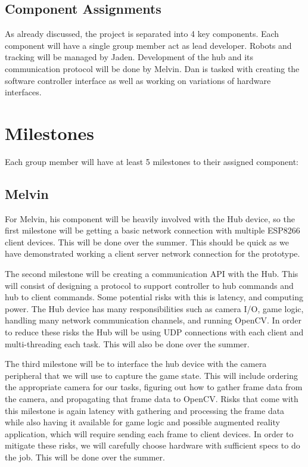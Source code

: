\documentclass[11pt]{ieeeconf}
\begin{document}
\subsection{Component Assignments}
As already discussed, the project is separated into 4 key components. Each component will have a single group member act as lead developer. Robots and tracking will be managed by Jaden. Development of the hub and its communication protocol will be done by Melvin. Dan is tasked with creating the software controller interface as well as working on variations of hardware interfaces. 


\section{Milestones}
Each group member will have at least 5 milestones to their assigned component: 

\subsection{Melvin}
For Melvin, his component will be heavily involved with the Hub device, so the first milestone will be getting a basic network connection with multiple ESP8266 client devices. This will be done over the summer. This should be quick as we have demonstrated working a client server network connection for the prototype. 

The second milestone will be creating a communication API with the Hub. This will consist of designing a protocol to support controller to hub commands and hub to client commands. Some potential risks with this is latency, and computing power. The Hub device has many responsibilities such as camera I/O, game logic, handling many network communication channels, and running OpenCV. In order to reduce these risks the Hub will be using UDP connections with each client and multi-threading each task. This will also be done over the summer.

The third milestone will be to interface the hub device with the camera peripheral that we will use to capture the game state. This will include ordering the appropriate camera for our tasks, figuring out how to gather frame data from the camera, and propagating that frame data to OpenCV. Risks that come with this milestone is again latency with gathering and processing the frame data while also having it available for game logic and possible augmented reality application, which will require sending each frame to client devices. In order to mitigate these risks, we will carefully choose hardware with sufficient specs to do the job. This will be done over the summer.
\end{document}
